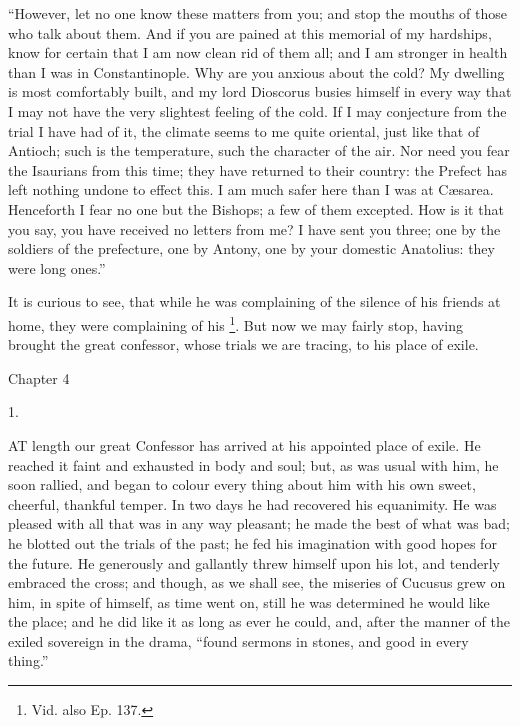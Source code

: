 ``However, let no one know these matters from you; and stop the mouths of those who talk about them. And if you are
pained at this memorial of my hardships, know for certain that I am
now clean rid of them all; and I am stronger in health than I was in
Constantinople. Why are you anxious about the cold? My dwelling is
most comfortably built, and my lord Dioscorus busies himself in every
way that I may not have the very slightest feeling of the cold. If I
may conjecture from the trial I have had of it, the climate seems to
me quite oriental, just like that of Antioch; such is the temperature,
such the character of the air. Nor need you fear the Isaurians from
this time; they have returned to their country: the Prefect has left
nothing undone to effect this. I am much safer here than I was at
Cæsarea. Henceforth I fear no one but the Bishops; a few of them
excepted. How is it that you say, you have received no letters from
me? I have sent you three; one by the soldiers of the prefecture, one
by Antony, one by your domestic Anatolius: they were long ones.''

It is curious to see, that while he was complaining of the silence
of his friends at home, they were complaining of his \footnote{Vid. also Ep. 137.}. But now we may fairly stop, having brought the great
confessor, whose trials we are tracing, to his place of exile.

Chapter 4


1.

AT length our great Confessor has
arrived at his appointed place of exile. He reached it faint and
exhausted in body and soul; but, as was usual with him, he soon
rallied, and began to colour every thing about him with his own sweet,
cheerful, thankful temper. In two days he had recovered his
equanimity. He was pleased with all that was in any way pleasant; he
made the best of what was bad; he blotted out the trials of the past;
he fed his imagination with good hopes for the future. He generously
and gallantly threw himself upon his lot, and tenderly embraced the
cross; and though, as we shall see, the miseries of Cucusus grew on
him, in spite of himself, as time went on, still he was determined he
would like the place; and he did like it as long as ever he could,
and, after the manner of the exiled sovereign in the drama,
``found sermons in stones, and good in every thing.''

